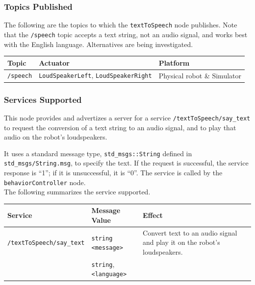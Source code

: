 \documentclass{CSSRforAfrica}
\begin{document}
{\subsubsection*{Topics Published}
The following are the topics to which the {\small \verb+textToSpeech+} node publishes.  Note that the {\small \verb+/speech+}  topic  accepts a text string, not an audio signal, and works best with the English language.  Alternatives are being investigated.
 
\begin{center}
\begin{tabularx}{\linewidth}{| l | l | X|}
\hline 
{\small Topic }                               & {\small  Actuator}    &  {\small Platform}       \\
\hline
{\footnotesize \verb+/speech+ }  & {\footnotesize \verb+LoudSpeakerLeft+, \verb+LoudSpeakerRight+} & {\small Physical robot \& Simulator} \\ 
\hline
\end{tabularx}
\end{center}

\subsubsection*{Services Supported}
This node  provides and advertizes a server for a service {\small \verb+/textToSpeech/say_text+} to request the conversion of a text string to an audio signal, and to play that audio on the robot's loudspeakers.

It uses a standard message type, {\small \verb+std_msgs::String+} defined in {\small \verb+std_msgs/String.msg+}, to specify the text.  If the request is successful, the service response is ``1''; if it is unsuccessful, it is ``0''.  
The service is called by  the {\small \verb+behaviorController+} node. \\


\noindent The following summarizes the service supported.

\begin{center}
\begin{tabularx}{\linewidth}{| l | l | X|}
\hline 
{\small Service }                                                                                & {\small Message Value}    &  {\small Effect}       \\
\hline
{\footnotesize \verb+/textToSpeech/say_text+ }  & {\footnotesize \verb+string+ \verb+<message>+}  & {\small Convert text to an audio signal and play it on the robot's loudspeakers.} \\ 
    & {\footnotesize \verb+string+}, {\footnotesize \verb+<language>+}      &  \\ 
\hline
\end{tabularx}
\end{center}

}
\end{document}
